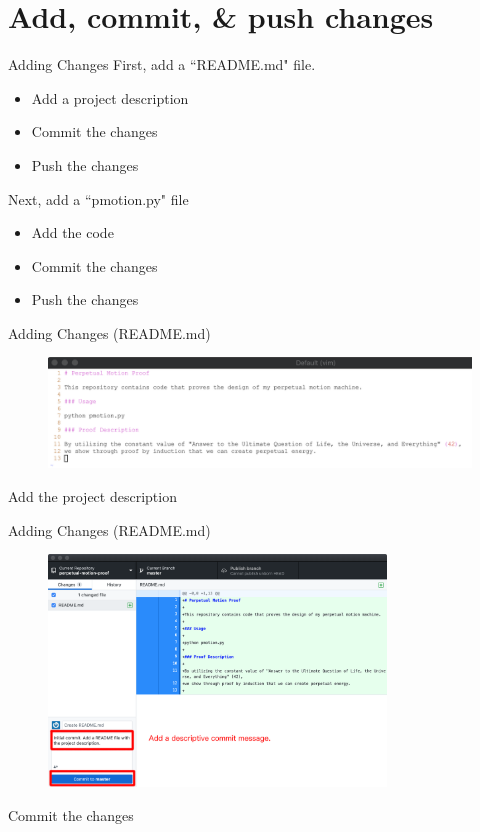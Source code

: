 \documentclass{beamer}
\begin{document}
    \section{Add, commit, \& push changes}
    \begin{frame}{Adding Changes}
        First, add a ``README.md" file.
        \begin{itemize}
            \item Add a project description
            \item Commit the changes
            \item Push the changes
        \end{itemize}

        Next, add a ``pmotion.py" file
        \begin{itemize}
            \item Add the code
            \item Commit the changes
            \item Push the changes
        \end{itemize}
    \end{frame}

    \begin{frame}{Adding Changes (README.md)}
        \begin{figure}
            \centering
            \includegraphics[width=\textwidth]{figures/add_1.png}
        \end{figure}
        \centering
        Add the project description
    \end{frame}

    \begin{frame}{Adding Changes (README.md)}
        \begin{figure}
            \centering
            \includegraphics[width=0.8\textwidth]{figures/add_2.png}
        \end{figure}

        \centering
        Commit the changes
    \end{frame}
\end{document}
